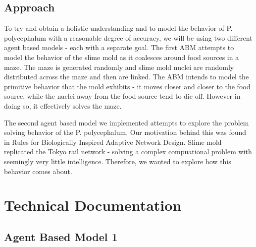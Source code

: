 \documentclass[a4paper, 12pt]{article}
\begin{document}
\subsection{Approach}

To try and obtain a holistic understanding and to model the behavior of P. polycephalum with a reasonable degree of accuracy, we will be using two different agent based models - each with a separate goal. The first ABM attempts to model the behavior of the slime mold as it coalesces around food sources in a maze. The maze is generated randomly and slime mold nuclei are randomly distributed across the maze and then are linked. The ABM intends to model the primitive behavior that the mold exhibits - it moves closer and closer to the food source, while the nuclei away from the food source tend to die off. However in doing so, it effectively solves the maze. 

The second agent based model we implemented attempts to explore the problem solving behavior of the P. polycephalum. Our motivation behind this was found in Rules for Biologically Inspired Adaptive Network Design. Slime mold replicated the Tokyo rail network - solving a complex compuational problem with seemingly very little intelligence. Therefore, we wanted to explore how this behavior comes about.        
\newpage
\section{Technical Documentation }
\subsection{Agent Based Model 1}
\end{document}
